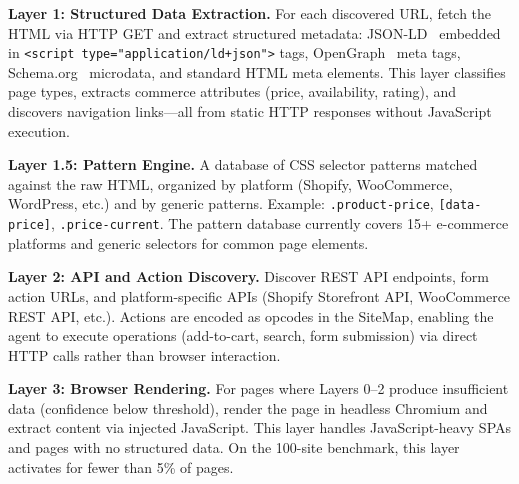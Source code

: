 \documentclass[10pt, twocolumn]{article}
\begin{document}
\textbf{Layer 1: Structured Data Extraction.} For each discovered URL, fetch the HTML via HTTP GET and extract structured metadata: JSON-LD~\cite{jsonld2014} embedded in \texttt{<script type="application/ld+json">} tags, OpenGraph~\cite{opengraph2010} meta tags, Schema.org~\cite{schemaorg2011} microdata, and standard HTML meta elements. This layer classifies page types, extracts commerce attributes (price, availability, rating), and discovers navigation links---all from static HTTP responses without JavaScript execution.

\textbf{Layer 1.5: Pattern Engine.} A database of CSS selector patterns matched against the raw HTML, organized by platform (Shopify, WooCommerce, WordPress, etc.) and by generic patterns. Example: \texttt{.product-price}, \texttt{[data-price]}, \texttt{.price-current}. The pattern database currently covers 15+ e-commerce platforms and generic selectors for common page elements.

\textbf{Layer 2: API and Action Discovery.} Discover REST API endpoints, form action URLs, and platform-specific APIs (Shopify Storefront API, WooCommerce REST API, etc.). Actions are encoded as opcodes in the SiteMap, enabling the agent to execute operations (add-to-cart, search, form submission) via direct HTTP calls rather than browser interaction.

\textbf{Layer 3: Browser Rendering.} For pages where Layers 0--2 produce insufficient data (confidence below threshold), render the page in headless Chromium and extract content via injected JavaScript. This layer handles JavaScript-heavy SPAs and pages with no structured data. On the 100-site benchmark, this layer activates for fewer than 5\% of pages.
\end{document}
